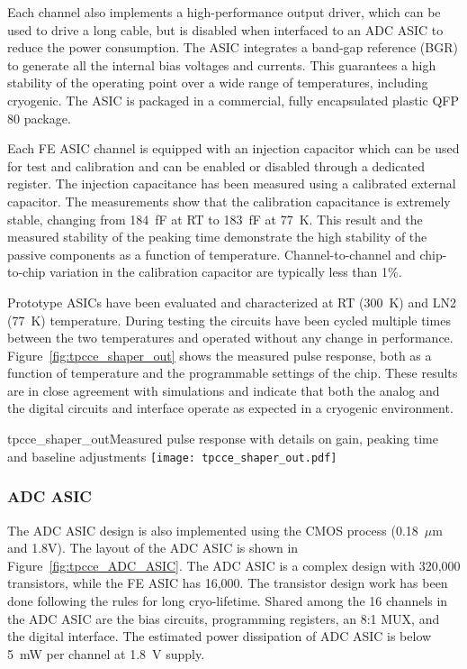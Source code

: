 Each channel also implements a high-performance output driver,
which can be used to drive a long cable, but is disabled when interfaced to an ADC ASIC to reduce the power consumption.
The ASIC integrates a band-gap reference (BGR) to generate all the internal bias voltages and currents.
This guarantees a high stability of the operating point over a wide range of
temperatures, including cryogenic.
The ASIC is packaged in a commercial, fully encapsulated plastic QFP 80 package.

Each FE ASIC channel is equipped with an injection capacitor which can be used
for test and calibration and can be enabled or disabled through a
dedicated register. The injection capacitance has been measured using 
a calibrated external capacitor. The measurements show
that the calibration capacitance is extremely stable, changing from
184~fF at RT to 183~fF at 77~K. This result and the measured
stability of the peaking time demonstrate the high stability of the
passive components as a function of temperature. Channel-to-channel and chip-to-chip
variation in the calibration capacitor are typically less than 1\%. 

Prototype ASICs have been evaluated and characterized at RT (300~K) and LN2 (77~K) temperature.
During testing the circuits have been cycled multiple times
between the two temperatures and operated without any change in performance.
Figure~\ref{fig:tpcce_shaper_out} shows the measured pulse response, both as a function
of temperature and the programmable settings of the chip.
These results are in close agreement with simulations and indicate
that both the analog and the digital circuits and interface operate as
expected in a cryogenic environment.

\begin{cdrfigure}{tpcce_shaper_out}{Measured pulse response with
 details on gain, peaking time and baseline adjustments}
\texttt{[image: tpcce\_shaper\_out.pdf]}
\end{cdrfigure}

\subsubsection{ADC ASIC}

The ADC ASIC design is also implemented using the CMOS process (0.18~$\mu$m and 1.8V).
The layout of the ADC ASIC is shown in Figure~\ref{fig:tpcce_ADC_ASIC}. 
The ADC ASIC is a complex design with 320,000 transistors, while the FE ASIC has 16,000.
The transistor design work has been done following the rules for long cryo-lifetime.
Shared among the 16 channels in the ADC ASIC are the bias circuits, programming registers,
an 8:1 MUX, and the digital interface.
The estimated power dissipation of ADC ASIC is below 5~mW per channel at 1.8~V supply.
  
